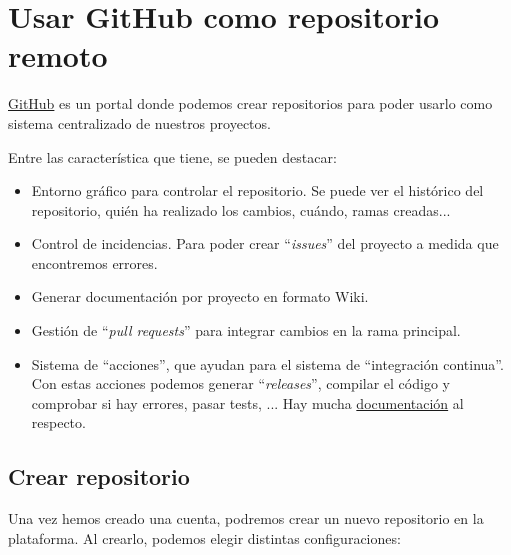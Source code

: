 \chapter{Usar GitHub como repositorio remoto}
\href{https://github.com/}{GitHub} es un portal donde podemos crear repositorios para poder usarlo como sistema centralizado de nuestros proyectos.

Entre las característica que tiene, se pueden destacar:
\begin{itemize}
    \item Entorno gráfico para controlar el repositorio. Se puede ver el histórico del repositorio, quién ha realizado los cambios, cuándo, ramas creadas...
    \item Control de incidencias. Para poder crear “\textit{issues}” del proyecto a medida que encontremos errores.
    \item Generar documentación por proyecto en formato Wiki.
    \item Gestión de “\textit{pull requests}” para integrar cambios en la rama principal.
    \item Sistema de “acciones”, que ayudan para el sistema de “integración continua”. Con estas acciones podemos generar “\textit{releases}”, compilar el código y comprobar si hay errores, pasar tests, ... Hay mucha \href{https://docs.github.com/en/actions}{documentación} al respecto.
\end{itemize}

\section{Crear repositorio}

Una vez hemos creado una cuenta, podremos crear un nuevo repositorio en la plataforma. Al crearlo, podemos elegir distintas configuraciones:


